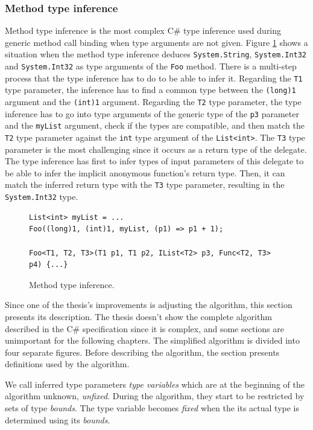 \subsubsection*{Method type inference}
Method type inference is the most complex C\# type inference used during generic method call binding when type arguments are not given. 
Figure \ref{img09:methodTypeInf} shows a situation when the method type inference deduces \texttt{System.String}, \texttt{System.Int32} and \texttt{System.Int32} as type arguments of the \texttt{Foo} method. 
There is a multi-step process that the type inference has to do to be able to infer it. 
Regarding the \texttt{T1} type parameter, the inference has to find a common type between the \texttt{(long)1} argument and the \texttt{(int)1} argument. 
Regarding the \texttt{T2} type parameter, the type inference has to go into type arguments of the generic type of the \texttt{p3} parameter and the \texttt{myList} argument, check if the types are compatible, and then match the \texttt{T2} type parameter against the \texttt{int} type argument of the \texttt{List<int>}. 
The \texttt{T3} type parameter is the most challenging since it occurs as a return type of the delegate. 
The type inference has first to infer types of input parameters of this delegate to be able to infer the implicit anonymous function’s return type. 
Then, it can match the inferred return type with the \texttt{T3} type parameter, resulting in the \texttt{System.Int32} type.
\begin{figure}[h]
\begin{lstlisting}[style=csharp]
List<int> myList = ...
Foo((long)1, (int)1, myList, (p1) => p1 + 1);

Foo<T1, T2, T3>(T1 p1, T1 p2, IList<T2> p3, Func<T2, T3> p4) {...}
\end{lstlisting}
\caption{Method type inference.}
\label{img09:methodTypeInf}
\end{figure}
\par
Since one of the thesis's improvements is adjusting the algorithm, this section presents
its description. 
The thesis doesn’t show the complete algorithm described in the C\# specification \cite{online:csTypeInference} since it is complex, and some sections are unimportant for the following chapters. 
The simplified algorithm is divided into four separate figures. 
Before describing the algorithm, the section presents definitions used by the algorithm.
\begin{defn}
We call inferred type parameters \emph{type variables} which are at the beginning of the algorithm unknown, \emph{unfixed}. 
During the algorithm, they start to be restricted by sets of type \emph{bounds}.
The type variable becomes \emph{fixed} when the its actual type is determined using its \emph{bounds}.
\end{defn}

